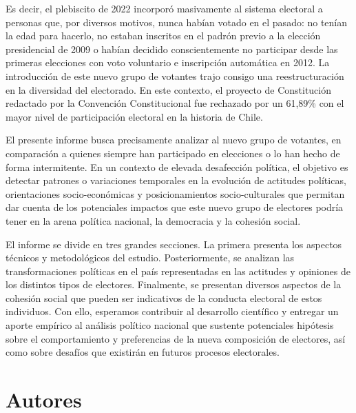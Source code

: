 \documentclass[
  12pt,
]{book}
\begin{document}
Es decir, el plebiscito de 2022 incorporó masivamente al sistema electoral a personas que, por diversos motivos, nunca habían votado en el pasado: no tenían la edad para hacerlo, no estaban inscritos en el padrón previo a la elección presidencial de 2009 o habían decidido conscientemente no participar desde las primeras elecciones con voto voluntario e inscripción automática en 2012. La introducción de este nuevo grupo de votantes trajo consigo una reestructuración en la diversidad del electorado. En este contexto, el proyecto de Constitución redactado por la Convención Constitucional fue rechazado por un 61,89\% con el mayor nivel de participación electoral en la historia de Chile.

El presente informe busca precisamente analizar al nuevo grupo de votantes, en comparación a quienes siempre han participado en elecciones o lo han hecho de forma intermitente. En un contexto de elevada desafección política, el objetivo es detectar patrones o variaciones temporales en la evolución de actitudes políticas, orientaciones socio-económicas y posicionamientos socio-culturales que permitan dar cuenta de los potenciales impactos que este nuevo grupo de electores podría tener en la arena política nacional, la democracia y la cohesión social.

El informe se divide en tres grandes secciones. La primera presenta los aspectos técnicos y metodológicos del estudio. Posteriormente, se analizan las transformaciones políticas en el país representadas en las actitudes y opiniones de los distintos tipos de electores. Finalmente, se presentan diversos aspectos de la cohesión social que pueden ser indicativos de la conducta electoral de estos individuos. Con ello, esperamos contribuir al desarrollo científico y entregar un aporte empírico al análisis político nacional que sustente potenciales hipótesis sobre el comportamiento y preferencias de la nueva composición de electores, así como sobre desafíos que existirán en futuros procesos electorales.

\hypertarget{autores}{%
\section*{Autores}\label{autores}}
\end{document}
